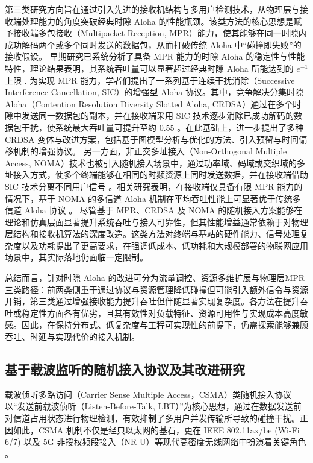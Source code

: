 第三类研究方向旨在通过引入先进的接收机结构与多用户检测技术，从物理层与接收端处理能力的角度突破经典时隙 Aloha 的性能瓶颈。该类方法的核心思想是赋予接收端多包接收（Multipacket Reception, MPR）能力，使其能够在同一时隙内成功解码两个或多个同时发送的数据包，从而打破传统 Aloha 中“碰撞即失败”的接收假设。
早期研究已系统分析了具备 MPR 能力的时隙 Aloha 的稳定性与性能特性，理论结果表明，其系统吞吐量可以显著超过经典时隙 Aloha 所能达到的 $e^{-1}$ 上限 \cite{1988_MPR,2022_MPR}. 为实现 MPR 能力，学者们提出了一系列基于连续干扰消除（Successive Interference Cancellation, SIC）的增强型 Aloha 协议。其中，竞争解决分集时隙 Aloha（Contention Resolution Diversity Slotted Aloha, CRDSA）通过在多个时隙中发送同一数据包的副本，并在接收端采用 SIC 技术逐步消除已成功解码的数据包干扰，使系统最大吞吐量可提升至约 0.55 \cite{2007_CRDSA}。在此基础上，\cite{2011_GraphCRDSA,2012_RCRDSA}进一步提出了多种 CRDSA 变体与改进方案，包括基于图模型分析与优化的方法、引入预留与时间偏移机制的增强协议。
另一方面，非正交多址接入（Non-Orthogonal Multiple Access, NOMA）技术也被引入随机接入场景中，通过功率域、码域或交织域的多址接入方式，使多个终端能够在相同的时频资源上同时发送数据，并在接收端借助 SIC 技术分离不同用户信号 \cite{2017_NOMA,2017_NOMA2,2021_NOMA}。相关研究表明，在接收端仅具备有限 MPR 能力的情况下，基于 NOMA 的多信道 Aloha 机制在平均吞吐性能上可显著优于传统多信道 Aloha 协议 \cite{2017_NOMA2}。
尽管基于 MPR、CRDSA 及 NOMA 的随机接入方案能够在理论和仿真层面显著提升系统吞吐与接入可靠性，但其性能增益通常依赖于对物理层结构和接收机算法的深度改造。这类方法对终端与基站的硬件能力、信号处理复杂度以及功耗提出了更高要求，在强调低成本、低功耗和大规模部署的物联网应用场景中，其实际落地仍面临一定限制。

总结而言，针对时隙 Aloha 的改进可分为流量调控、资源多维扩展与物理层MPR三类路径：前两类侧重于通过协议与资源管理降低碰撞但可能引入额外信令与资源开销，第三类通过增强接收能力提升吞吐但伴随显著实现复杂度。各方法在提升吞吐或稳定性方面各有优劣，且其有效性对负载特征、资源可用性与实现成本高度敏感。因此，在保持分布式、低复杂度与工程可实现性的前提下，仍需探索能够兼顾吞吐、时延与实现代价的接入机制。


\subsection{基于载波监听的随机接入协议及其改进研究}

载波侦听多路访问（Carrier Sense Multiple Access，CSMA）类随机接入协议以“发送前载波侦听（Listen-Before-Talk, LBT）”为核心思想，通过在数据发送前对信道占用状态进行物理检测，有效抑制了多用户并发传输所导致的碰撞干扰\cite{1975_CSMA}。正因如此，CSMA 机制不仅是经典以太网的基石，更在 IEEE 802.11ax/be (Wi-Fi 6/7) 以及 5G 非授权频段接入（NR-U）等现代高密度无线网络中扮演着关键角色 \cite{2016_IEEE80211}。

